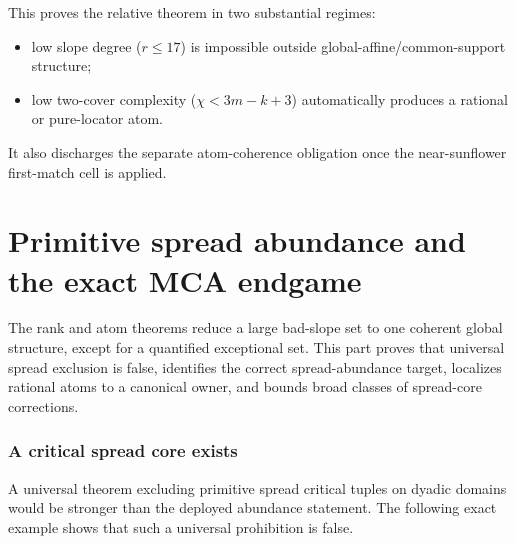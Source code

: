 \documentclass[11pt,a4paper]{amsart}
\numberwithin{equation}{section}
\theoremstyle{remark}
\begin{document}
This proves the relative theorem in two substantial regimes:
\begin{itemize}[leftmargin=2em]
\item low slope degree ($r\le17$) is impossible outside global-affine/common-support structure;
\item low two-cover complexity ($\chi<3m-k+3$) automatically produces a rational or pure-locator atom.
\end{itemize}
It also discharges the separate atom-coherence obligation once the near-sunflower first-match cell is applied.


\part{Primitive spread abundance and the exact MCA endgame}
\label{part:spread-endgame}
The rank and atom theorems reduce a large bad-slope set to one coherent global structure, except for a quantified exceptional set.  This part proves that universal spread exclusion is false, identifies the correct spread-abundance target, localizes rational atoms to a canonical owner, and bounds broad classes of spread-core corrections.

\section{A critical spread core exists}

A universal theorem excluding primitive spread critical tuples on dyadic domains would be stronger than the deployed abundance statement.  The following exact example shows that such a universal prohibition is false.
\end{document}
